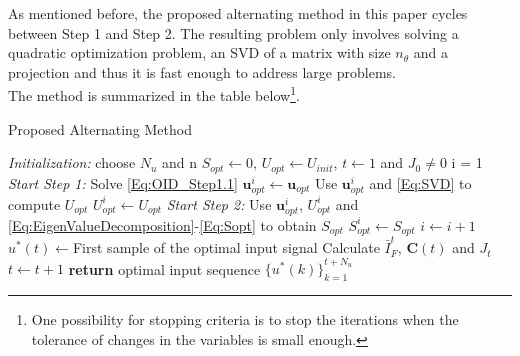 \documentclass{ifacconf}
\begin{document}
As mentioned before, the proposed alternating method in this paper cycles between Step 1 and Step 2. The resulting problem only involves solving a quadratic optimization problem, an SVD of a matrix with size $n_{\theta}$ and a projection and thus it is fast enough to address large problems. 
\\
The method is summarized in the table below\footnote{One possibility for stopping criteria is to stop the iterations when the tolerance of changes in the variables is small enough.}. 
\begin{algorithm}
\renewcommand{\thealgorithm}{}
  \caption{Proposed Alternating Method}\label{Proposed Alternating Method}
  \begin{algorithmic}[]
	  \State \emph{Initialization:}
	\State \quad choose $N_u$ and n
	\State \quad $S_{opt}\gets 0$, $U_{opt}\gets U_{init}$, $t\gets  1$ and $J_0 \neq 0$	
			\State i = 1
				\State \emph{Start Step 1:}
				\State \quad Solve \eqref{Eq:OID_Step1.1}
				\State \quad $\textbf{u}_{opt}^i \gets \textbf{u}_{opt}$
				\State \quad Use $\textbf{u}_{opt}^i$ and \eqref{Eq:SVD} to compute $U_{opt}$
				\State \quad ${U}_{opt}^i \gets U_{opt}$
				\State\emph{Start Step 2:}
				\State \quad Use $\textbf{u}_{opt}^i$, ${U}_{opt}^i$ and \eqref{Eq:EigenValueDecomposition}-\eqref{Eq:Sopt} to obtain $S_{opt}$
				\State \quad ${S}_{opt}^i \gets S_{opt}$
				\State $i \gets i+1$
			\EndWhile
        \State $u^*(t)\gets $First sample of the optimal input signal
        \State Calculate $\bar{I}_F^{t}$, $\textbf{C}(t)$ and $J_t$
        \State $t\gets  t+1$
      \EndWhile\label{euclidendwhile}
      \State \textbf{return} optimal input sequence ${\{u^*(k)\}}_{k=1}^{t+N_u}$
  \end{algorithmic}
\end{algorithm}
\vspace{-0.4cm}
\end{document}
